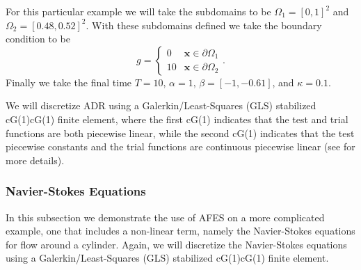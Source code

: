     For this particular example we will take the subdomains to be $\Omega_1 =
    [0,1]^2$ and $\Omega_2 = [0.48,0.52]^2$. With these subdomains defined we
    take the boundary condition to be
    \begin{equation}
        g = \begin{cases}
            0   &\mathbf{x} \in \partial \Omega_1 \\
            10  &\mathbf{x} \in \partial \Omega_2
        \end{cases}.
        \label{eq:ADRBCs}
    \end{equation}
    Finally we take the final time $T=10,\, \alpha=1,\, \beta = \left[ -1,
    -0.61 \right]$, and $\kappa = 0.1$.

    We will discretize ADR using a Galerkin\slash Least-Squares (GLS) stabilized
    cG(1)cG(1) finite element, where the first cG(1) indicates that the test and
    trial functions are both piecewise linear, while the second cG(1) indicates
    that the test piecewise constants and the trial functions are continuous
    piecewise linear (see \cite{Hoffman2006a} for more details).

    
    
\subsubsection{Navier-Stokes Equations} \label{sss:NSE}

    In this subsection we demonstrate the use of AFES on a more complicated
    example, one that includes a non-linear term, namely the Navier-Stokes
    equations for flow around a cylinder.  Again, we will discretize the
    Navier-Stokes equations using a Galerkin\slash Least-Squares (GLS)
    stabilized cG(1)cG(1) finite element.

